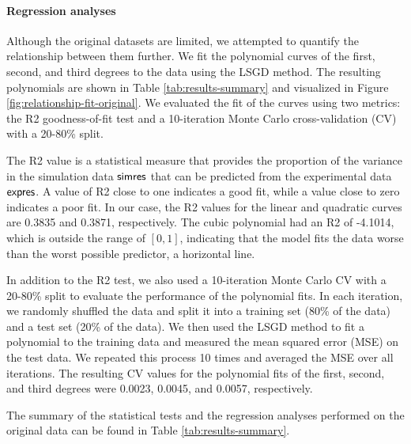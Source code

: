\paragraph{Regression analyses}

Although the original datasets are limited, we attempted to quantify the relationship between them further. We fit the polynomial curves of the first, second, and third degrees to the data using the LSGD method. The resulting polynomials are shown in Table \ref{tab:results-summary} and visualized in Figure \ref{fig:relationship-fit-original}. We evaluated the fit of the curves using two metrics: the R2 goodness-of-fit test and a 10-iteration Monte Carlo cross-validation (CV) with a 20-80\% split. 

The R2 value is a statistical measure that provides the proportion of the variance in the simulation data $\mathsf{simres}$ that can be predicted from the experimental data $\mathsf{expres}$. A value of R2 close to one indicates a good fit, while a value close to zero indicates a poor fit. In our case, the R2 values for the linear and quadratic curves are 0.3835 and 0.3871, respectively. The cubic polynomial had an R2 of -4.1014, which is outside the range of $[0, 1]$, indicating that the model fits the data worse than the worst possible predictor, a horizontal line.

In addition to the R2 test, we also used a 10-iteration Monte Carlo CV with a 20-80\% split to evaluate the performance of the polynomial fits. In each iteration, we randomly shuffled the data and split it into a training set (80\% of the data) and a test set (20\% of the data). We then used the LSGD method to fit a polynomial to the training data and measured the mean squared error (MSE) on the test data. We repeated this process 10 times and averaged the MSE over all iterations. The resulting CV values for the polynomial fits of the first, second, and third degrees were 0.0023, 0.0045, and 0.0057, respectively.

The summary of the statistical tests and the regression analyses performed on the original data can be found in Table \ref{tab:results-summary}.
